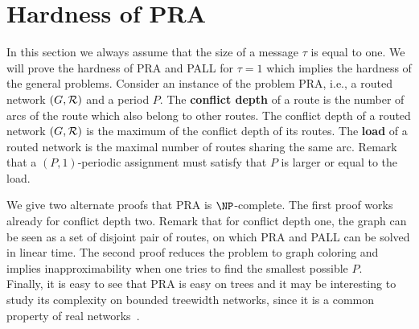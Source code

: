 \documentclass[10pt, conference, letterpaper]{IEEEtran}
\begin{document}
\section{Hardness of PRA}
  \label{sec:complexity}

 In this section we always assume that the size of a message $\tau$ is equal to one. 
 We will prove the hardness of PRA and PALL for $\tau =1$ which implies the hardness of the general problems. 
Consider an instance of the problem PRA, i.e., a routed network $(G,\cal{R})$ and a period $P$.
The {\bf conflict depth} of a route is the number of arcs of the route which also belong to other routes.
The conflict depth of a routed network $(G,\cal{R})$ is the maximum of the conflict depth of its routes.
The {\bf load} of a routed network is the maximal number of routes sharing the same arc.
Remark that a $(P,1)$-periodic assignment must satisfy that $P$ is larger or equal to the load.


We give two alternate proofs that PRA is $\NP$-complete.
The first proof works already for conflict depth two. Remark that for conflict depth one,
the graph can be seen as a set of disjoint pair of routes, on which PRA and PALL can be solved in linear time. 
 The second proof reduces the problem to graph coloring and implies inapproximability when one tries to find the smallest possible $P$. \\
 Finally, it is easy to see that PRA is easy on trees and it may be interesting to study its complexity on 
 bounded treewidth networks, since it is a common property of real networks~\cite{de2011treewidth}.
 
\end{document}

